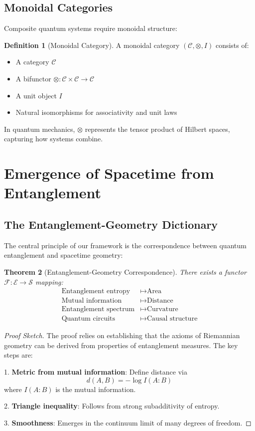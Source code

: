 \documentclass[12pt,a4paper]{article}
\newcommand{\cat}[1]{\mathcal{#1}}
\newcommand{\functor}{\mathcal{F}}
\theoremstyle{plain}
\newtheorem{theorem}{Theorem}[section]
\theoremstyle{definition}
\newtheorem{definition}[theorem]{Definition}
\theoremstyle{remark}
\begin{document}
\subsection{Monoidal Categories}

Composite quantum systems require monoidal structure:

\begin{definition}[Monoidal Category]
A monoidal category $(\cat{C}, \otimes, I)$ consists of:
\begin{itemize}
\item A category $\cat{C}$
\item A bifunctor $\otimes: \cat{C} \times \cat{C} \to \cat{C}$
\item A unit object $I$
\item Natural isomorphisms for associativity and unit laws
\end{itemize}
\end{definition}

In quantum mechanics, $\otimes$ represents the tensor product of Hilbert spaces, capturing how systems combine.

\section{Emergence of Spacetime from Entanglement}

\subsection{The Entanglement-Geometry Dictionary}

The central principle of our framework is the correspondence between quantum entanglement and spacetime geometry:

\begin{theorem}[Entanglement-Geometry Correspondence]
There exists a functor $\functor: \cat{E} \to \cat{S}$ mapping:
\begin{align}
\text{Entanglement entropy} &\mapsto \text{Area} \\
\text{Mutual information} &\mapsto \text{Distance} \\
\text{Entanglement spectrum} &\mapsto \text{Curvature} \\
\text{Quantum circuits} &\mapsto \text{Causal structure}
\end{align}
\end{theorem}

\begin{proof}[Proof Sketch]
The proof relies on establishing that the axioms of Riemannian geometry can be derived from properties of entanglement measures. The key steps are:

1. \textbf{Metric from mutual information}: Define distance via
\[d(A,B) = -\log I(A:B)\]
where $I(A:B)$ is the mutual information.

2. \textbf{Triangle inequality}: Follows from strong subadditivity of entropy.

3. \textbf{Smoothness}: Emerges in the continuum limit of many degrees of freedom.
\end{proof}
\end{document}

